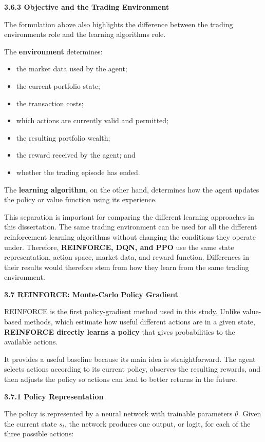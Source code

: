 \textbf{3.6.3 Objective and the Trading Environment}

The formulation above also highlights the difference between the trading
environment\textquotesingle s role and the learning
algorithm\textquotesingle s role.

The \textbf{environment} determines:

\begin{itemize}
\item
  the market data used by the agent;
\item
  the current portfolio state;
\item
  the transaction costs;
\item
  which actions are currently valid and permitted;
\item
  the resulting portfolio wealth;
\item
  the reward received by the agent; and
\item
  whether the trading episode has ended.
\end{itemize}

The \textbf{learning algorithm}, on the other hand, determines how the
agent updates the policy or value function using its experience.

This separation is important for comparing the different learning
approaches in this dissertation. The same trading environment can be
used for all the different reinforcement learning algorithms without
changing the conditions they operate under. Therefore,
\textbf{REINFORCE, DQN, and PPO} use the same state representation,
action space, market data, and reward function. Differences in their
results would therefore stem from how they learn from the same trading
environment.

\textbf{3.7 REINFORCE: Monte-Carlo Policy Gradient}

REINFORCE is the first policy-gradient method used in this study. Unlike
value-based methods, which estimate how useful different actions are in
a given state, \textbf{REINFORCE directly learns a policy} that gives
probabilities to the available actions.

It provides a useful baseline because its main idea is straightforward.
The agent selects actions according to its current policy, observes the
resulting rewards, and then adjusts the policy so actions can lead to
better returns in the future.

\textbf{3.7.1 Policy Representation}

The policy is represented by a neural network with trainable parameters
\(\theta\). Given the current state \(s_{t}\), the network produces one
output, or logit, for each of the three possible actions:

